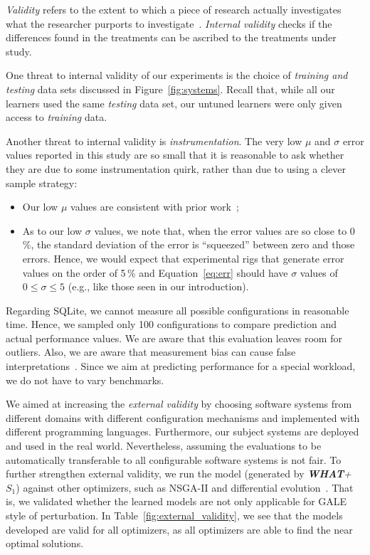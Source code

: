 \documentclass[smallextended]{svjour3}       %
\newcommand{\fig}[1]{Figure~\ref{fig:#1}}
\newcommand{\eq}[1]{Equation~\ref{eq:#1}}
\newcommand{\what}{{\bf WHAT}\xspace}
\begin{document}
{\em Validity} refers to the extent to which a piece of research actually
investigates what the researcher purports to investigate~\cite{SSA15}.
{\em Internal validity} checks if the differences found in
the treatments can be ascribed to the treatments under study. 

One threat to internal validity of our experiments is the choice
of {\em training and testing} data sets discussed in 
\fig{systems}. Recall that, while all our learners used the same
{\em testing} data set, our untuned learners were only given
access to {\em training} data.

Another threat to internal validity  is {\em instrumentation}. The very low $\mu$ and $\sigma$ error values
reported in this study are so small that it is reasonable to ask whether they are due to some instrumentation
quirk, rather than due to using a clever sample strategy:
\begin{itemize}
\item
Our low $\mu$ values are consistent with prior work~\cite{sarkar2015cost};
\item
As to our low $\sigma$ values, we note that, when the  error values are so close to 0\,\%, the standard
deviation of the error is ``squeezed'' between zero and those errors. Hence, we would expect that
experimental rigs
that generate error values on the order of 5\,\% and \eq{err} should have $\sigma$ values of $0\le \sigma \le 5$ (e.g., like those seen in our introduction).
\end{itemize}

Regarding SQLite, we cannot measure all possible configurations in reasonable time. Hence, we sampled only 100 configurations to compare prediction and actual performance values. We are aware that this evaluation leaves room for outliers.
Also, we are aware that measurement bias can cause false interpretations~\cite{me12d}. Since we aim at predicting performance for a special workload, we do not have to vary benchmarks.



  We aimed at increasing the {\em external validity} by choosing software systems from different domains with different configuration mechanisms and implemented with different programming languages. Furthermore, our subject systems  are deployed and used in the real world. Nevertheless, assuming the evaluations to be automatically transferable  to all configurable software systems is not fair. To further strengthen external validity, we run the model (generated by \textit{\what + $S_1$}) against other optimizers, such as NSGA-II and differential evolution~\cite{storn1997differential}. That is, we validated whether the learned models are not only applicable for GALE style of perturbation. In Table~\ref{fig:external_validity}, we see that the models developed are valid for all optimizers, as all optimizers are able to find the near optimal solutions.
\end{document}
